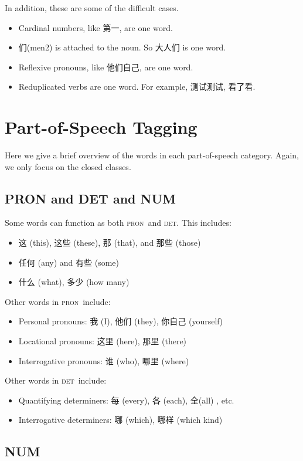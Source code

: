 \documentclass[UTF8,oneside]{book}
\def\pron{\textsc{pron}}
\def\det{\textsc{det}}
\begin{document}
In addition, these are some of the difficult cases.

\begin{itemize}
\item Cardinal numbers, like 第一, are one word. 
\item 们(men2) is attached to the noun. So 大人们 is one word.
\item Reflexive pronouns, like 他们自己, are one word. 
\item Reduplicated verbs are one word. For example, 测试测试, 看了看.
\end{itemize}


\chapter{Part-of-Speech Tagging}

Here we give a brief overview of the words in each part-of-speech category. Again, we only focus on the closed classes. 


\section{PRON and DET and NUM}
Some words can function as both \pron\ and \det. This includes:
\begin{itemize}
\item 这 (this), 这些 (these), 那 (that), and 那些 (those)
\item 任何 (any) and 有些 (some)
\item 什么 (what),  多少 (how many)
\end{itemize}

Other words in \pron\ include:
\begin{itemize}
\item Personal pronouns: 我 (I), 他们 (they), 你自己 (yourself)
\item Locational pronouns: 这里 (here), 那里 (there)
\item Interrogative pronouns: 谁 (who), 哪里 (where)
\end{itemize}

Other words in \det\ include:
\begin{itemize}
\item Quantifying determiners: 每 (every), 各 (each), 全(all) , etc.
\item Interrogative determiners: 哪 (which), 哪样 (which kind)
\end{itemize}

\section{NUM}
\end{document}
